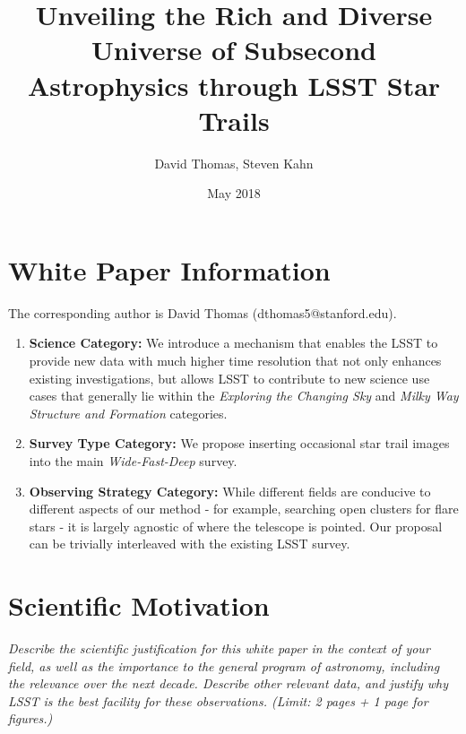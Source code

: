 \documentclass[12pt, letterpaper]{article}
\title{Unveiling the Rich and Diverse Universe of Subsecond Astrophysics through LSST Star Trails}
\author{David Thomas, Steven Kahn}
\date{May 2018}
\begin{document}
\maketitle


\section{White Paper Information}
The corresponding author is David Thomas (dthomas5@stanford.edu).

\begin{enumerate} 
\item {\bf Science Category:} We introduce a mechanism that enables the LSST to provide new data with much higher time resolution that not only enhances existing investigations, but allows LSST to contribute to new science use cases that generally lie within the \textit{Exploring the Changing Sky} and \textit{Milky Way Structure and Formation} categories.

\item {\bf Survey Type Category:} We propose inserting occasional star trail images into the main \textit{Wide-Fast-Deep} survey.

\item {\bf Observing Strategy Category:}
While different fields are conducive to different aspects of our method - for example, searching open clusters for flare stars - it is largely agnostic of where the telescope is pointed. Our proposal can be trivially interleaved with the existing LSST survey.

\end{enumerate}  


\clearpage

\section{Scientific Motivation}

\begin{footnotesize}
{\it Describe the scientific justification for this white paper in the context
of your field, as well as the importance to the general program of astronomy, 
including the relevance over the next decade. 
Describe other relevant data, and justify why LSST is the best facility for these observations.
(Limit: 2 pages + 1 page for figures.)}
\end{footnotesize}
\\
\end{document}
